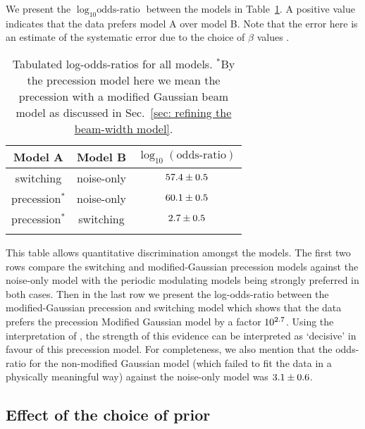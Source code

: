 \documentclass[../full_thesis/full_thesis.tex]{subfiles}
\begin{document}
We present the $\log_{10}\textrm{odds-ratio}$ between the models in
Table~\ref{tab: log odds-ratio}. A positive value indicates
that the data prefers model A over model B.
Note that the error here is an estimate of the systematic error due to the
choice of $\beta$ values \citep[see][for details]{Foreman-Mackay2013}.
\begin{table}
\caption{Tabulated log-odds-ratios for all models. $^{*}$By the precession
model here we mean the precession with a modified Gaussian beam model as
discussed in Sec.~\ref{sec: refining the beam-width model}.}
\label{tab: log odds-ratio}
\begin{tabular}{ccc}\hhline{===}
Model A & Model B & $\log_{10}(\textrm{odds-ratio})$ \\ \hline
switching & noise-only &
$57.4 \pm 0.5$ \\
precession$^{*}$ & noise-only &
$60.1 \pm 0.5 $ \\
precession$^{*}$ & switching &
$2.7 \pm 0.5 $ \\
\hhline{===}
\end{tabular}
\end{table}

This table allows quantitative discrimination amongst the models. The first two
rows compare the switching and modified-Gaussian precession models against the
noise-only model with the periodic modulating models being strongly preferred
in both cases. Then in the last row we present the log-odds-ratio between the
modified-Gaussian precession and switching model which shows that the data
prefers the precession Modified Gaussian model by a factor
$10^{2.7}$. Using the interpretation
of \citet{jeffreys1998theory}, the strength of this evidence can be interpreted
as `decisive' in favour of this precession model. For completeness, we also
mention that the odds-ratio for the non-modified Gaussian model (which failed
to fit the data in a physically meaningful way) against the noise-only model
was $3.1 \pm
0.6$.

\subsection{Effect of the choice of prior}
\label{sec: effect of the choice of prior}
\end{document}
